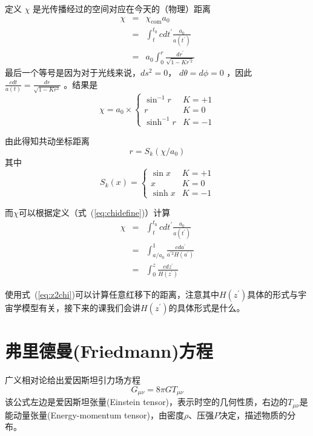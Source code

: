\documentclass[]{ctexart}
\newcommand{\refeq}[1]{式~(\ref{#1})}
\begin{document}
定义 $\chi$ 是光传播经过的空间对应在今天的（物理）距离
\begin{eqnarray}
    \chi &=& \chi_\text{com} a_0 \\
        &=& \int_t^{t_0} c dt^\prime \frac{a_0}{a(t^\prime)} \label{eq:chidefine} \\ 
        &=& a_0 \int_0^r \frac{dr^\prime}{\sqrt{1-Kr^{\prime 2}}}
\end{eqnarray}
最后一个等号是因为对于光线来说，$ds^2=0$， $d\theta=d\phi = 0$ ，因此 $\frac{c dt}{a(t)}=\frac{dr}{\sqrt{1-Kr^2}}$ 。结果是
\begin{equation}
    \chi = a_0 \times
    \begin{cases}
        \sin^{-1} r & K=+1 \\ 
        r & K=0 \\ 
        \sinh^{-1} r & K=-1
    \end{cases}
\end{equation}

由此得知共动坐标距离
\begin{equation}
    r = S_k(\chi/a_0)
\end{equation}
其中
\begin{equation}
    S_k(x) = 
    \begin{cases}
        \sin{x} & K=+1 \\ 
        x & K=0 \\ 
        \sinh{x}  & K=-1
    \end{cases}
\end{equation}

而$\chi$可以根据定义（\refeq{eq:chidefine}）计算
\begin{eqnarray}
    \chi &=& \int_t^{t_0} c dt^\prime \frac{a_0}{a(t^\prime)} \\
        &=& \int_{a/a_0}^{1}  \frac{c da^\prime}{a^{\prime 2}H(a^\prime)} \\
        &=& \int_{0}^{z}  \frac{c dz^\prime}{H(z^\prime)} \label{eq:z2chi}
\end{eqnarray}

使用\refeq{eq:z2chi}可以计算任意红移下的距离，注意其中$H(z^\prime)$具体的形式与宇宙学模型有关，接下来的课我们会讲$H(z^\prime)$的具体形式是什么。

\section{弗里德曼(Friedmann)方程}

广义相对论给出爱因斯坦引力场方程
\begin{equation} \label{eq:field}
    G_{\mu \nu} = 8 \pi G T_{\mu \nu}
\end{equation}
该公式左边是爱因斯坦张量(Einstein tensor)，表示时空的几何性质，右边的$T_{\mu\nu}$是能动量张量(Energy-momentum tensor)，由密度$\rho$、压强$P$决定，描述物质的分布。
\end{document}
